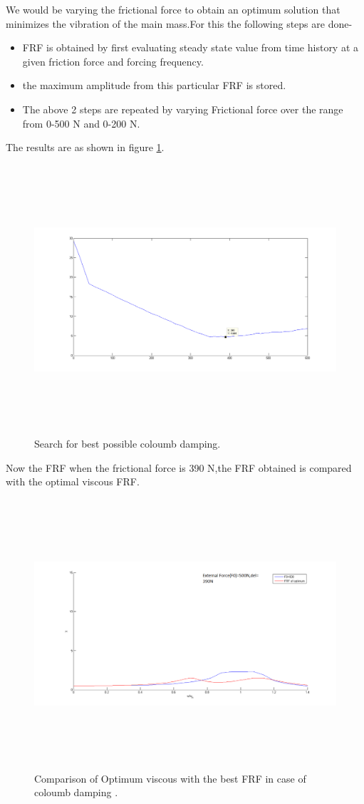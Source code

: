   We would be varying the frictional force to obtain an optimum solution that minimizes the vibration of the main mass.For this the following steps are done-
  \begin{itemize}
  \item FRF is obtained by first evaluating steady state value from time history at a given friction force and forcing frequency.
\item the maximum amplitude from this particular FRF is stored.
\item The above 2 steps are repeated by varying Frictional force over the range from 0-500 N and 0-200 N.
\end{itemize}
The results are as shown in figure \ref{fig:28}.
\begin{figure}[h!]
\includegraphics[width=16cm,height=10cm]{"figures/28"}
  \caption{Search for best possible coloumb damping.}
  \label{fig:28}
  \end{figure}
  Now the FRF when the frictional force is 390 N,the FRF obtained is compared with the optimal viscous FRF.
  \begin{figure}[h!]
\includegraphics[width=16cm,height=10cm]{"figures/32"}
  \caption{Comparison of Optimum viscous with the best FRF in case of coloumb damping .}
  \label{fig:32}
  \end{figure}
